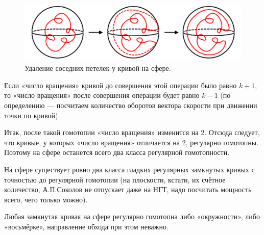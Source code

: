 \begin{figure}[htbp]
    \centering
    \includegraphics[scale=0.7]{images/c13.6.png}
    \caption{Удаление соседних петелек у кривой на сфере.}
    \label{fig:c13.6}
\end{figure}

Если «число вращения» кривой до совершения этой операции было равно $k+1$, то «число вращения» после совершения операции будет равно $k-1$ (по определению — посчитаем количество оборотов вектора скорости при движении точки по кривой).

Итак, после такой гомотопии «число вращения» изменится на 2. Отсюда следует, что кривые, у которых «число вращения» отличается на 2, регулярно гомотопны. Поэтому на сфере останется всего два класса регулярной гомотопности.

\begin{statement}
    На сфере существует ровно два класса гладких регулярных замкнутых кривых с точностью до регулярной гомотопии (на плоскости, кстати, их счётное количество, А.П.Соколов не отпускает даже на НГТ, надо посчитать мощность всего, чего только можно).
\end{statement} 

\begin{theorem}
    Любая замкнутая кривая на сфере регулярно гомотопна либо «окружности», либо «восьмёрке», направление обхода при этом неважно.
\end{theorem} 